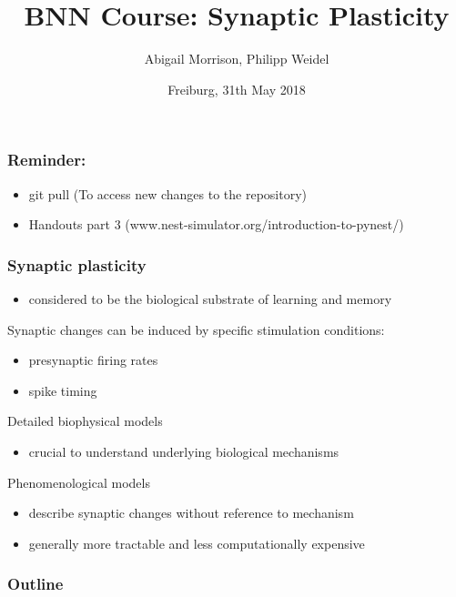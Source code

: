 \documentclass{beamer}
\title[] %
{
BNN Course: Synaptic Plasticity
}
\author[Morrison] 
{Abigail Morrison, Philipp Weidel}
\institute[] %
{
Institute of Neuroscience and Medicine (INM-6) \\
J\"ulich Research Center
}
\date[] %
{Freiburg, 31th May 2018}
\begin{document}
\begin{frame}
  \titlepage
\end{frame}


\begin{frame}
  \frametitle{Reminder:}
  
\begin{itemize}
  \item git pull (To access new changes to the repository)
  \item Handouts part 3 (www.nest-simulator.org/introduction-to-pynest/)
\end{itemize}

\end{frame}

\begin{frame}
  \frametitle{Synaptic plasticity}
  
\begin{itemize}
  \item considered to be the biological substrate of learning and memory
\end{itemize}
  
  Synaptic changes can be induced by specific stimulation conditions:%
\small{
\begin{itemize}
  \item presynaptic firing rates
  \item spike timing
\end{itemize}
  }
  
\vspace*{5mm}

  Detailed biophysical models
\small
{
\begin{itemize}
  \item crucial to understand underlying biological mechanisms
\end{itemize}
}
  
  Phenomenological models
\small
{
\begin{itemize}
  \item describe synaptic changes without reference to mechanism
  \item generally more tractable and less computationally expensive
\end{itemize}
}

\end{frame}
\begin{frame}
  \frametitle{Outline}
  \tableofcontents
\end{frame}
\end{document}
